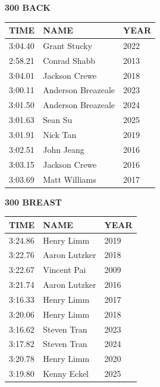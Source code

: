 \begin{table}[H]
\centering
\begin{minipage}[t]{0.48\textwidth}
\centering
\textbf{300 BACK}\\[0.1cm]
\begin{tabular}{@{}p{1.8cm}p{2.8cm}p{1.2cm}@{}}
\hline
    \textbf{TIME} & \textbf{NAME} & \textbf{YEAR} \\
\hline
    3:04.40 & Grant Stucky & 2022 \\
    2:58.21 & Conrad Shabb & 2013 \\
    3:04.01 & Jackson Crewe & 2018 \\
    3:00.11 & Anderson Breazeale & 2023 \\
    3:01.50 & Anderson Breazeale & 2024 \\
    3:01.63 & Sean Su & 2025 \\
    3:01.91 & Nick Tan & 2019 \\
    3:02.51 & John Jeang & 2016 \\
    3:03.15 & Jackson Crewe & 2016 \\
    3:03.69 & Matt Williams & 2017 \\
\hline
\end{tabular}
\end{minipage}\hfill
\begin{minipage}[t]{0.48\textwidth}
\centering
\textbf{300 BREAST}\\[0.1cm]
\begin{tabular}{@{}p{1.8cm}p{2.8cm}p{1.2cm}@{}}
\hline
    \textbf{TIME} & \textbf{NAME} & \textbf{YEAR} \\
\hline
    3:24.86 & Henry Limm & 2019 \\
    3:22.76 & Aaron Lutzker & 2018 \\
    3:22.67 & Vincent Pai & 2009 \\
    3:21.74 & Aaron Lutzker & 2016 \\
    3:16.33 & Henry Limm & 2017 \\
    3:20.06 & Henry Limm & 2018 \\
    3:16.62 & Steven Tran & 2023 \\
    3:17.82 & Steven Tran & 2024 \\
    3:20.78 & Henry Limm & 2020 \\
    3:19.80 & Kenny Eckel & 2025 \\
\hline
\end{tabular}
\end{minipage}
\end{table}

